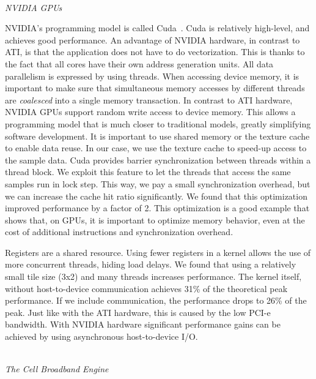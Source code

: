 \documentclass{article}
\newcommand{\longversion}[1]{}
\begin{document}
\noindent \\ \emph{NVIDIA GPUs}

\noindent NVIDIA's programming model is called Cuda~\cite{cuda-manual}.
Cuda is relatively high-level, and achieves good performance.
An advantage of NVIDIA hardware, in contrast to ATI, is that the application does not have to do 
vectorization. This is thanks to the fact that all cores have their own address generation units. 
All data parallelism is expressed by using threads.
When accessing device memory, it is important to make sure that
simultaneous memory accesses by different threads are \emph{coalesced}
into a single memory transaction.  In contrast to ATI hardware, NVIDIA
GPUs support random write access to device memory. This allows a
programming model that is much closer to traditional models, greatly
simplifying software development.
It is important to use shared memory or the texture cache to enable data reuse.
In our case, we use the texture cache to speed-up access to the sample data. 
Cuda provides barrier synchronization between threads within a thread block.
We exploit this feature to let
the threads that access the same samples run in lock step.  This way,
we pay a small synchronization overhead, but we can increase the cache hit
ratio significantly.  We found that this optimization improved performance by a factor of 2.
This optimization is a good example that shows that, on GPUs, it is important to optimize
memory behavior, even at the cost of additional instructions and synchronization overhead.

\longversion{
We also investigated the use of the per-multiprocessor shared memory as an
application-managed cache.  Others report good results with this
approach~\cite{gpu-cache}.  However, we found that, for our
application, the use of shared memory only led to performance
degradation.
}

Registers are a shared resource. Using fewer registers in a kernel
allows the use of more concurrent threads, hiding load delays.
We found that using a relatively small tile size (3x2) and many threads increases performance.
The kernel itself, without host-to-device communication achieves 31\%
of the theoretical peak performance.  If we include communication, the
performance drops to 26\% of the peak. Just like with the ATI
hardware, this is caused by the low PCI-e bandwidth.  With NVIDIA
hardware significant performance gains can be achieved by using asynchronous host-to-device I/O.


\noindent \\ \emph{The Cell Broadband Engine}
\end{document}
